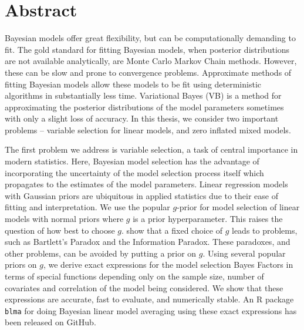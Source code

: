 

\chapter*{Abstract}

Bayesian models offer great flexibility, but can be computationally demanding
to fit. The gold standard for fitting Bayesian models, when posterior
distributions are not available analytically, are Monte Carlo Markov Chain
methods. However, these can be slow and prone to convergence problems.
Approximate methods of fitting Bayesian models allow these models to be fit
using deterministic algorithms in substantially less time.  Variational Bayes
(VB) is a method for approximating the posterior distributions of the model
parameters sometimes with only a slight loss of accuracy.
In this thesis, we consider two important problems --  variable selection for linear models, and
zero inflated mixed
models. 

The first problem we address is variable selection, a task of central
importance in modern statistics. Here, Bayesian model selection has the
advantage of incorporating the uncertainty of the model selection process
itself which propagates to the estimates of the model  parameters. Linear
regression models with Gaussian priors are ubiquitous in applied statistics due
to their ease of fitting and interpretation. We use the popular $g$-prior
\cite{Zellner1986} for model selection of linear models with normal priors
where $g$ is a prior hyperparameter. This raises the question of how best to
choose $g$. \cite{Liang2008} show that a fixed choice of $g$ leads to problems,
such as Bartlett's Paradox and the Information Paradox. These paradoxes, and
other problems, can be avoided by putting a prior on $g$. Using several popular
priors on $g$, we derive exact expressions for the model selection Bayes
Factors in terms of special functions depending only on  the sample size,
number of covariates and correlation of the model being considered. We show
that these expressions are accurate, fast to evaluate, and numerically stable.
An R package \texttt{blma} for doing Bayesian linear model averaging using
these exact expressions has been  released on GitHub.

